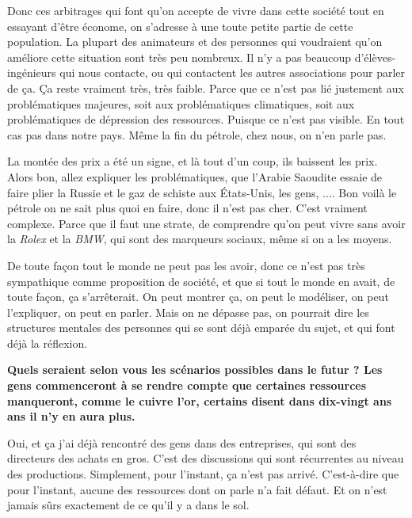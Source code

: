 \begin{small}
\smallbreak
Donc ces arbitrages qui font qu'on accepte de vivre dans cette société tout en essayant d'être économe, on s'adresse à une toute petite partie de cette population. La plupart des animateurs et des personnes qui voudraient qu'on améliore cette situation sont très peu nombreux. Il n'y a pas beaucoup d'élèves-ingénieurs qui nous contacte, ou qui contactent les autres associations pour parler de ça. Ça reste vraiment très, très faible. Parce que ce n'est pas lié justement aux problématiques majeures, soit aux problématiques climatiques, soit aux problématiques de dépression des ressources. Puisque ce n'est pas visible. En tout cas pas dans notre pays. Même la fin du pétrole, chez nous, on n'en parle pas.

La montée des prix a été un signe, et là tout d'un coup, ils baissent les prix. Alors bon, allez expliquer les problématiques, que l'Arabie Saoudite essaie de faire plier la Russie et le gaz de schiste aux États-Unis, les gens, .... Bon voilà le pétrole on ne sait plus quoi en faire, donc il n'est pas cher. C'est vraiment complexe. Parce que il faut une strate, de comprendre qu'on peut vivre sans  avoir la \textit{Rolex} et la \textit{BMW}, qui sont des marqueurs sociaux, même si on a les moyens. 

\smallbreak
De toute façon tout le monde ne peut pas les avoir, donc ce n'est pas très sympathique comme proposition de société, et que si tout le monde en avait, de toute façon, ça s'arrêterait. On peut montrer ça, on peut le modéliser, on peut l'expliquer, on peut en parler. Mais on ne dépasse pas, on pourrait dire les structures mentales des personnes qui se sont déjà emparée du sujet, et qui font déjà la réflexion.

\vspace{1\baselineskip}

\textbf{Quels seraient selon vous les scénarios possibles dans le futur ? Les gens commenceront à se rendre compte que certaines ressources manqueront, comme le cuivre l'or, certains disent dans dix-vingt ans ans il n'y en aura plus.}

\vspace{1\baselineskip}

Oui, et ça j'ai déjà rencontré des gens dans des entreprises, qui sont des directeurs des achats en gros. C'est des discussions qui sont récurrentes au niveau des productions. Simplement, pour l'instant, ça n'est pas arrivé. C'est-à-dire que pour l'instant, aucune des ressources dont on parle n'a fait défaut. Et on n'est jamais sûrs exactement de ce qu'il y a dans le sol. 


\end{small}

